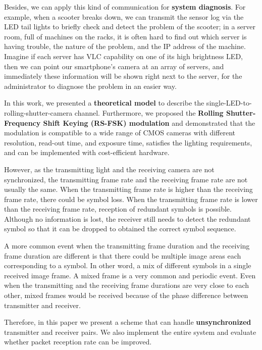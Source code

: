 Besides, we can apply this kind of communication for \textbf{system diagnosis}. For example, when a scooter breaks down, we can transmit the sensor log via the LED tail lights to briefly check and detect the problem of the scooter; in a server room, full of machines on the racks, it is often hard to find out which server is having trouble, the nature of the problem, and the IP address of the machine. Imagine if each server has VLC capability on one of its high brightness LED, then we can point our smartphone's camera at an array of servers, and immediately these information will be shown right next to the server, for the administrator to diagnose the problem in an easier way.  

In this work, we presented a \textbf{theoretical model} to describe the single-LED-to-rolling-shutter-camera channel. Furthermore, we proposed the \textbf{Rolling Shutter-Frequency Shift Keying (RS-FSK) modulation} and demonstrated that the modulation is compatible to a wide range of CMOS cameras with different resolution, read-out time, and exposure time, satisfies the lighting requirements, and can be implemented with cost-efficient hardware.

However, as the transmitting light and the receiving camera are not synchronized, the transmitting frame rate and the receiving frame rate are not usually the same.
When the transmitting frame rate is higher than the receiving frame rate, there could be symbol loss.
When the transmitting frame rate is lower than the receiving frame rate, reception of redundant symbols is possible. 
Although no information is lost, the receiver still needs to detect the redundant symbol so that it can be dropped to obtained the correct symbol sequence.

A more common event when the transmitting frame duration and the receiving frame duration are different is that there could be multiple image areas each corresponding to a symbol. In other word, a mix of different symbols in a single received image frame. 
A mixed frame is a very common and periodic event.
Even when the transmitting and the receiving frame durations are very close to each other, mixed frames would be received because of the phase difference between transmitter and receiver.

Therefore, in this paper we present a scheme that can handle \textbf{unsynchronized} transmitter and receiver pairs. 
We also implement the entire system and evaluate whether packet reception rate can be improved.

